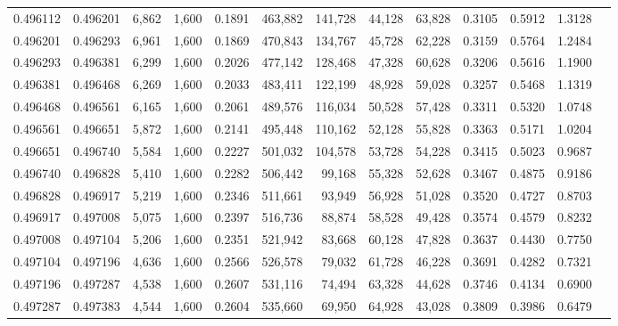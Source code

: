 \begin{tabular}{rrrrrrrrrrrrr}
0.496112 & 0.496201 &  6,862 & 1,600 &                                     0.1891 & 463,882 & 141,728 &  44,128 &  63,828 & 0.3105 & 0.5912 & 1.3128 \\
0.496201 & 0.496293 &  6,961 & 1,600 &                                     0.1869 & 470,843 & 134,767 &  45,728 &  62,228 & 0.3159 & 0.5764 & 1.2484 \\
0.496293 & 0.496381 &  6,299 & 1,600 &                                     0.2026 & 477,142 & 128,468 &  47,328 &  60,628 & 0.3206 & 0.5616 & 1.1900 \\
0.496381 & 0.496468 &  6,269 & 1,600 &                                     0.2033 & 483,411 & 122,199 &  48,928 &  59,028 & 0.3257 & 0.5468 & 1.1319 \\
0.496468 & 0.496561 &  6,165 & 1,600 &                                     0.2061 & 489,576 & 116,034 &  50,528 &  57,428 & 0.3311 & 0.5320 & 1.0748 \\
0.496561 & 0.496651 &  5,872 & 1,600 &                                     0.2141 & 495,448 & 110,162 &  52,128 &  55,828 & 0.3363 & 0.5171 & 1.0204 \\
0.496651 & 0.496740 &  5,584 & 1,600 &                                     0.2227 & 501,032 & 104,578 &  53,728 &  54,228 & 0.3415 & 0.5023 & 0.9687 \\
0.496740 & 0.496828 &  5,410 & 1,600 &                                     0.2282 & 506,442 &  99,168 &  55,328 &  52,628 & 0.3467 & 0.4875 & 0.9186 \\
0.496828 & 0.496917 &  5,219 & 1,600 &                                     0.2346 & 511,661 &  93,949 &  56,928 &  51,028 & 0.3520 & 0.4727 & 0.8703 \\
0.496917 & 0.497008 &  5,075 & 1,600 &                                     0.2397 & 516,736 &  88,874 &  58,528 &  49,428 & 0.3574 & 0.4579 & 0.8232 \\
0.497008 & 0.497104 &  5,206 & 1,600 &                                     0.2351 & 521,942 &  83,668 &  60,128 &  47,828 & 0.3637 & 0.4430 & 0.7750 \\
0.497104 & 0.497196 &  4,636 & 1,600 &                                     0.2566 & 526,578 &  79,032 &  61,728 &  46,228 & 0.3691 & 0.4282 & 0.7321 \\
0.497196 & 0.497287 &  4,538 & 1,600 &                                     0.2607 & 531,116 &  74,494 &  63,328 &  44,628 & 0.3746 & 0.4134 & 0.6900 \\
0.497287 & 0.497383 &  4,544 & 1,600 &                                     0.2604 & 535,660 &  69,950 &  64,928 &  43,028 & 0.3809 & 0.3986 & 0.6479 \\

\end{tabular}
